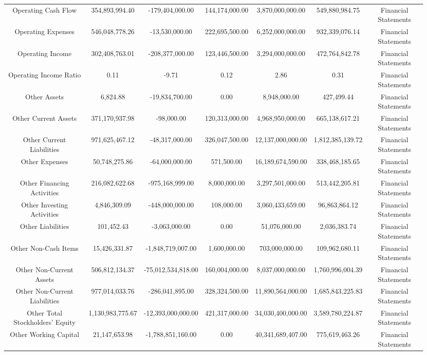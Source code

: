 \begin{longtable}{ccccccc}
Operating Cash Flow & 354,893,994.40 & -179,404,000.00 & 144,174,000.00 & 3,870,000,000.00 & 549,880,984.75 & Financial Statements \\
Operating Expenses & 546,048,778.26 & -13,530,000.00 & 222,695,500.00 & 6,252,000,000.00 & 932,339,076.14 & Financial Statements \\
Operating Income & 302,408,763.01 & -208,377,000.00 & 123,446,500.00 & 3,294,000,000.00 & 472,764,842.78 & Financial Statements \\
Operating Income Ratio & 0.11 & -9.71 & 0.12 & 2.86 & 0.31 & Financial Statements \\
Other Assets & 6,824.88 & -19,834,700.00 & 0.00 & 8,948,000.00 & 427,499.44 & Financial Statements \\
Other Current Assets & 371,170,937.98 & -98,000.00 & 120,313,000.00 & 4,968,950,000.00 & 665,138,617.21 & Financial Statements \\
Other Current Liabilities & 971,625,467.12 & -48,317,000.00 & 326,047,500.00 & 12,137,000,000.00 & 1,812,385,139.72 & Financial Statements \\
Other Expenses & 50,748,275.86 & -64,000,000.00 & 571,500.00 & 16,189,674,590.00 & 338,468,185.65 & Financial Statements \\
Other Financing Activities & 216,082,622.68 & -975,168,999.00 & 8,000,000.00 & 3,297,501,000.00 & 513,442,205.81 & Financial Statements \\
Other Investing Activities & 4,846,309.09 & -448,000,000.00 & 108,000.00 & 3,060,433,659.00 & 96,863,864.12 & Financial Statements \\
Other Liabilities & 101,452.43 & -3,063,000.00 & 0.00 & 51,076,000.00 & 2,036,383.74 & Financial Statements \\
Other Non-Cash Items & 15,426,331.87 & -1,848,719,007.00 & 1,600,000.00 & 703,000,000.00 & 109,962,680.11 & Financial Statements \\
Other Non-Current Assets & 506,812,134.37 & -75,012,534,818.00 & 160,004,000.00 & 8,037,000,000.00 & 1,760,996,004.39 & Financial Statements \\
Other Non-Current Liabilities & 977,014,033.76 & -286,041,895.00 & 328,324,500.00 & 11,890,564,000.00 & 1,685,843,225.83 & Financial Statements \\
Other Total Stockholders' Equity & 1,130,983,775.67 & -12,393,000,000.00 & 421,317,000.00 & 34,030,400,000.00 & 3,589,780,224.87 & Financial Statements \\
Other Working Capital & 21,147,653.98 & -1,788,851,160.00 & 0.00 & 40,341,689,407.00 & 775,619,463.26 & Financial Statements \\

\end{longtable}
